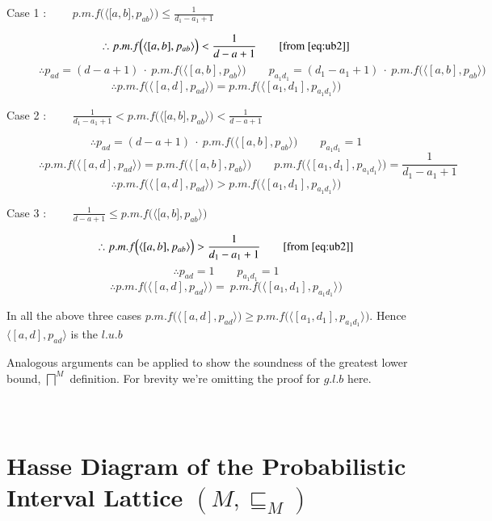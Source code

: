 \documentclass[final,3p, review, times]{util/elsarticle}
\begin{document}
\begin{description}
	\item[Case 1 : $\qquad\displaystyle p.m.f\Big(\langle\lbrack a,b\rbrack,p_{ab}\rangle\Big)\leq\frac{1}{d_1-a_1+1}$] \hfill
	$$\therefore \displaystyle p.m.f\Big(\langle[a,b],p_{ab}\rangle\Big)<\frac{1}{d-a+1}\qquad[\mathrm{from}\ \ref{eq:ub2}]$$
	$$\therefore p_{ad}=(d-a+1)\ \cdot\ p.m.f\Big(\langle[a,b],p_{ab}\rangle\Big)\qquad p_{a_1d_1}=(d_1-a_1+1)\ \cdot\ p.m.f\Big(\langle[a,b],p_{ab}\rangle\Big)$$
	$$\therefore p.m.f\Big(\langle[a,d],p_{ad}\rangle\Big)=p.m.f\Big(\langle[a_1,d_1],p_{a_1d_1}\rangle\Big)$$
	\item[Case 2 : $\qquad\displaystyle \frac{1}{d_1-a_1+1}<p.m.f\Big(\langle\lbrack a,b\rbrack,p_{ab}\rangle\Big)<\frac{1}{d-a+1}$] \hfill
	$$\therefore p_{ad}=(d-a+1)\ \cdot\ p.m.f\Big(\langle[a,b],p_{ab}\rangle\Big)\qquad p_{a_1d_1}=1$$
	$$\therefore p.m.f\Big(\langle[a,d],p_{ad}\rangle\Big)=p.m.f\Big(\langle[a,b],p_{ab}\rangle\Big)\qquad p.m.f\Big(\langle[a_1,d_1],p_{a_1d_1}\rangle\Big)=\frac{1}{d_1-a_1+1}$$
	$$\therefore p.m.f\Big(\langle[a,d],p_{ad}\rangle\Big)>p.m.f\Big(\langle[a_1,d_1],p_{a_1d_1}\rangle\Big)$$
	\item[Case 3 : $\qquad\displaystyle \frac{1}{d-a+1}\leq p.m.f\Big(\langle\lbrack a,b\rbrack,p_{ab}\rangle\Big)$] \hfill
	$$\therefore \displaystyle p.m.f\Big(\langle[a,b],p_{ab}\rangle\Big)>\frac{1}{d_1-a_1+1}\qquad[\mathrm{from}\ \ref{eq:ub2}]$$
	$$\therefore p_{ad}=1\qquad p_{a_1d_1}=1$$
	$$\therefore p.m.f\Big(\langle[a,d],p_{ad}\rangle\Big)=\ p.m.f\Big(\langle[a_1,d_1],p_{a_1d_1}\rangle\Big)$$
\end{description}

In all the above three cases $p.m.f\Big(\langle[a,d],p_{ad}\rangle\Big)\geq p.m.f\Big(\langle[a_1,d_1],p_{a_1d_1}\rangle\Big)$. Hence $\langle[a,d],p_{ad}\rangle$ is the $l.u.b$

Analogous arguments can be applied to show the soundness of the greatest lower bound, $\displaystyle\bigsqcap^M$ definition. For brevity we're omitting the proof for $g.l.b$ here.









\newpage
\section{\\Hasse Diagram of the Probabilistic Interval Lattice $(M,\sqsubseteq_M)$}
\label{app:interval_hasse}
\end{document}
